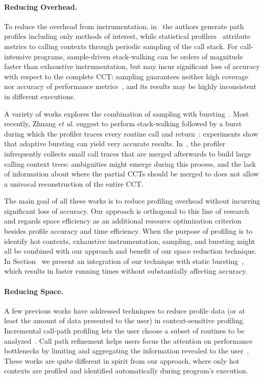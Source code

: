 \paragraph*{Reducing Overhead.} To reduce the overhead from instrumentation, in~\cite{Bernat07} the authors generate path profiles including only methods of interest, while statistical profilers~\cite{Arnold00,Froyd05,Hall93,Whaley00} attribute metrics to calling contexts through periodic sampling of the call stack. For call-intensive programs, sample-driven stack-walking can be orders of magnitude faster than exhaustive instrumentation, but may incur significant loss of accuracy with respect to the complete CCT: sampling guarantees neither high coverage~\cite{Bond07} nor accuracy of performance metrics~\cite{Zhuang06}, and its results may be highly inconsistent in different executions.

\noindent A variety of works explores the combination of sampling with bursting~\cite{Arnold01,Hirzel01,Zhuang06}. Most recently, Zhuang {\em et al.} suggest to perform stack-walking followed by a burst during which the profiler traces every routine call and return~\cite{Zhuang06}: experiments show that adaptive bursting can yield very accurate results. In~\cite{Serrano09}, the profiler infrequently collects small call traces that are merged afterwards to build large calling context trees: ambiguities might emerge during this process, and the lack of information about where the partial CCTs should be merged to does not allow a univocal reconstruction of the entire CCT.

The main goal of all these works is to reduce profiling overhead without incurring significant loss of accuracy. Our approach is orthogonal to this line of research and regards space efficiency as an additional resource optimization criterion besides profile accuracy and time efficiency. When the purpose of profiling is to identify hot contexts, exhaustive instrumentation, sampling, and bursting might all be combined with our approach and benefit of our space reduction technique. In Section \missing\ we present an integration of our technique with static bursting~\cite{Zhuang06}, which results in faster running times without substantially affecting accuracy.

\paragraph*{Reducing Space.} A few previous works have addressed techniques to reduce profile data (or at least the amount of data presented to the user) in context-sensitive profiling. Incremental call-path profiling lets the user choose a subset of routines to be analyzed~\cite{Bernat07}. Call path refinement helps users focus the attention on performance bottlenecks by limiting and aggregating the information revealed to the user~\cite{Hall95}. These works are quite different in spirit from our approach, where only hot contexts are profiled and identified automatically during program's execution.

